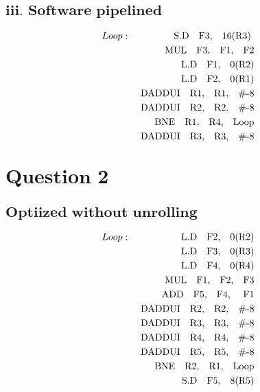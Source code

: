 \documentclass{tufte-handout}
\begin{document}
	\subsection{$\textbf{iii.\ Software pipelined}$}
	\begin{eqnarray*}
		Loop : & & \mbox{ S.D\quad F3,\quad 16(R3) } \\
		       & & \mbox{ MUL\quad F3,\quad F1,\quad F2} \\
		       & & \mbox{ L.D\quad F1,\quad 0(R2)} \\
		       & & \mbox{ L.D\quad F2,\quad 0(R1)} \\
		       & & \mbox{ DADDUI\quad R1,\quad R1,\quad \#-8} \\
		       & & \mbox{ DADDUI\quad R2,\quad R2,\quad \#-8} \\
		       & & \mbox{ BNE\quad R1,\quad R4,\quad Loop} \\
		       & & \mbox{ DADDUI\quad R3,\quad R3,\quad \#-8} \\
	\end{eqnarray*}

\section{$\textbf{Question 2}$}
	\subsection{$\textbf{Optiized without unrolling}$}
		\begin{eqnarray*}
			Loop : & & \mbox{ L.D\quad F2,\quad 0(R2)} \\
			       & & \mbox{ L.D\quad F3,\quad 0(R3)} \\
			       & & \mbox{ L.D\quad F4,\quad 0(R4)} \\
			       & & \mbox{ MUL\quad F1,\quad F2,\quad F3} \\
			       & & \mbox{ ADD\quad F5,\quad F4, \quad F1} \\
			       & & \mbox{ DADDUI\quad R2,\quad R2,\quad \#-8} \\
			       & & \mbox{ DADDUI\quad R3,\quad R3,\quad \#-8} \\
			       & & \mbox{ DADDUI\quad R4,\quad R4,\quad \#-8} \\
			       & & \mbox{ DADDUI\quad R5,\quad R5,\quad \#-8} \\
			       & & \mbox{ BNE\quad R2,\quad R1,\quad Loop} \\
			       & & \mbox{ S.D\quad F5,\quad 8(R5)} \\
		\end{eqnarray*}
		

		
  
  
  
  
\end{document}
